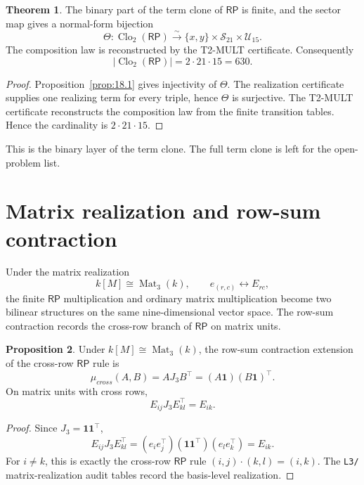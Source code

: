 \documentclass[11pt]{article}
\theoremstyle{definition}
\newtheorem{theorem}{Theorem}[section]
\newtheorem{proposition}[theorem]{Proposition}
\newcommand{\RP}{\mathsf{RP}}
\begin{document}
\begin{theorem}
\label{thm:18.3}
The binary part of the term clone of \(\RP\) is finite, and the sector map gives
a normal-form bijection
\[
\Theta:\operatorname{Clo}_2(\RP)
\xrightarrow{\sim}
\{x,y\}\times\mathcal S_{21}\times\mathcal U_{15}.
\]
The composition law is reconstructed by the T2-MULT certificate.  Consequently
\[
|\operatorname{Clo}_2(\RP)|=2\cdot21\cdot15=630.
\]
\end{theorem}

\begin{proof}
Proposition~\ref{prop:18.1} gives injectivity of \(\Theta\).  The
realization certificate supplies one realizing term for every triple, hence
\(\Theta\) is surjective.  The T2-MULT certificate reconstructs the composition
law from the finite transition tables.  Hence the cardinality is
\(2\cdot21\cdot15\).
\end{proof}

This is the binary layer of the term clone.  The full term clone is left for
the open-problem list.

\section{Matrix realization and row-sum contraction}\label{matrix-realization-row-sum-contraction}\label{cross-row-row-sum-contraction}

Under the matrix realization
\[
k[M]\cong\operatorname{Mat}_3(k),
\qquad e_{(r,c)}\leftrightarrow E_{rc},
\]
the finite \(\RP\) multiplication and ordinary matrix multiplication become
two bilinear structures on the same nine-dimensional vector space.
The row-sum contraction records the cross-row branch of \(\RP\) on matrix
units.

\begin{proposition}
\label{prop:16.3}
Under \(k[M]\cong\operatorname{Mat}_3(k)\), the row-sum contraction extension of
the cross-row \(\RP\) rule is
\[
\mu_{cross}(A,B)=AJ_3B^\top=(A\mathbf1)(B\mathbf1)^\top.
\]
On matrix units with cross rows,
\[
E_{ij}J_3E_{kl}^\top=E_{ik}.
\]
\end{proposition}

\begin{proof}
Since \(J_3=\mathbf1\mathbf1^\top\),
\[
E_{ij}J_3E_{kl}^\top
=(e_ie_j^\top)(\mathbf1\mathbf1^\top)(e_le_k^\top)
=E_{ik}.
\]
For \(i\ne k\), this is exactly the cross-row \(\RP\) rule
\((i,j)\cdot(k,l)=(i,k)\).  The \texttt{L3/} matrix-realization audit tables
record the basis-level realization.
\end{proof}
\end{document}
